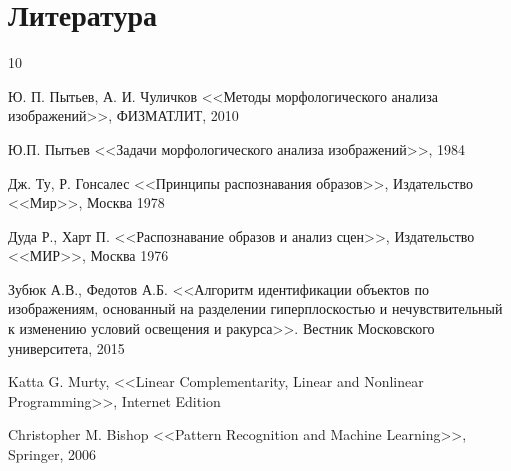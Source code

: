 \documentclass[a4paper, 12pt]{article}
\begin{document}
\newpage
\section{Литература}

\begin{thebibliography}{10}

 Ю. П. Пытьев, А. И. Чуличков <<Методы морфологического анализа изображений>>, ФИЗМАТЛИТ, 2010

 Ю.П. Пытьев <<Задачи морфологического анализа изображений>>, 1984

 Дж. Ту, Р. Гонсалес <<Принципы распознавания образов>>, Издательство <<Мир>>,\; Москва 1978

 Дуда Р., Харт П. <<Распознавание образов и анализ сцен>>, Издательство <<МИР>>, Москва 1976

 Зубюк А.В., Федотов А.Б. <<Алгоритм идентификации объектов по изображениям, основанный на разделении гиперплоскостью и нечувствительный к изменению условий освещения и ракурса>>. Вестник Московского университета, 2015

 Katta G. Murty, <<Linear Complementarity, Linear and Nonlinear Programming>>, Internet Edition

 Christopher M. Bishop <<Pattern Recognition and Machine Learning>>, Springer, 2006

\end{thebibliography}
\end{document}
